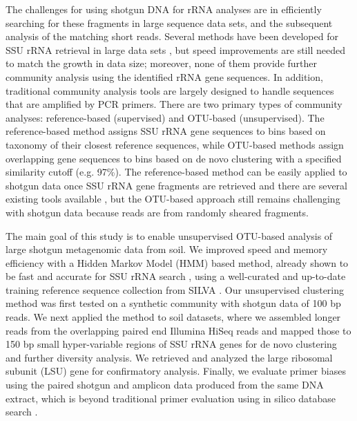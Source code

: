 \documentclass[]{msu-thesis}
\begin{document}
The challenges for using shotgun DNA for rRNA analyses are in efficiently searching for these fragments in large sequence data sets, and the subsequent analysis of the matching short reads. Several methods have been developed for SSU rRNA retrieval in large data sets \cite{schmieder_identification_2012,huang_identification_2009,lee_rrnaselector:_2011,bengtsson_metaxa:_2011}, but speed improvements are still needed to match the growth in data size; moreover, none of them provide further community analysis using the identified rRNA gene sequences. In addition, traditional community analysis tools \cite{cole_ribosomal_2014,schloss_introducing_2009,kuczynski_using_2012} are largely designed to handle sequences that are amplified by PCR primers. There are two primary types of community analyses: reference-based (supervised) and OTU-based (unsupervised). The reference-based method assigns SSU rRNA gene sequences to bins based on taxonomy of their closest reference sequences, while OTU-based methods assign overlapping gene sequences to bins based on de novo clustering with a specified similarity cutoff (e.g. 97\%). The reference-based method can be easily applied to shotgun data once SSU rRNA gene fragments are retrieved \cite{wang_naive_2007} and there are several existing tools available \cite{shah_comparing_2011,darling_phylosift:_2014,meyer_metagenomics_2008,huson_megan_2007,logares_metagenomic_2014}, but the OTU-based approach still remains challenging with shotgun data because reads are from randomly sheared fragments.

The main goal of this study is to enable unsupervised OTU-based analysis of large shotgun metagenomic data from soil. We improved speed and memory efficiency with a Hidden Markov Model (HMM) based method, already shown to be fast and accurate for SSU rRNA search \cite{huang_identification_2009,lee_rrnaselector:_2011,bengtsson_metaxa:_2011}, using a well-curated and up-to-date training reference sequence collection from SILVA \cite{quast_silva_2013}. Our unsupervised clustering method was first tested on a synthetic community with shotgun data of 100 bp reads. We next applied the method to soil datasets, where we assembled longer reads from the overlapping paired end Illumina HiSeq reads and mapped those to 150 bp small hyper-variable regions of SSU rRNA genes for de novo clustering and further diversity analysis. We retrieved and analyzed the large ribosomal subunit (LSU) gene for confirmatory analysis. Finally, we evaluate primer biases using the paired shotgun and amplicon data produced from the same DNA extract, which is beyond traditional primer evaluation using in silico database search \cite{mao_coverage_2012,klindworth_evaluation_2013}.
\end{document}
